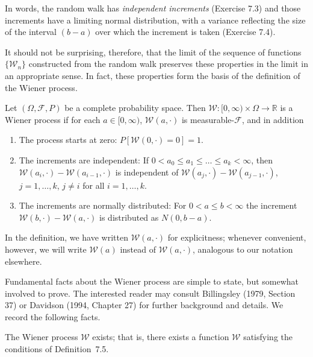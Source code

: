 In words, the random walk has \emph{independent increments} (Exercise 7.3) and those increments have a limiting normal distribution, with a variance reflecting the size of the interval $(b-a)$ over which the increment is taken (Exercise 7.4).

It should not be surprising, therefore, that the limit of the sequence of functions $\{\mathcal{W}_n\}$ constructed from the random walk preserves these properties in the limit in an appropriate sense. In fact, these properties form the basis of the definition of the Wiener process.

\begin{definition}\label{def:wiener}
Let $(\Omega, \mathcal{F}, P)$ be a complete probability space. Then $\mathcal{W} : [0,\infty) \times \Omega \to \mathbb{R}$ is a Wiener process if for each $a \in [0,\infty)$, $\mathcal{W}(a, \cdot)$ is measurable-$\mathcal{F}$, and in addition
\begin{enumerate}[label=(\roman*)]
\item The process starts at zero: $P[\mathcal{W}(0, \cdot) = 0] = 1$.
\item The increments are independent: If $0 < a_0 \leq a_1 \leq \ldots \leq a_k < \infty$, then $\mathcal{W}(a_i, \cdot) - \mathcal{W}(a_{i-1}, \cdot)$ is independent of $\mathcal{W}(a_j, \cdot) - \mathcal{W}(a_{j-1}, \cdot)$, $j = 1, \ldots, k$, $j \neq i$ for all $i = 1, \ldots, k$.
\item The increments are normally distributed: For $0 < a \leq b < \infty$ the increment $\mathcal{W}(b, \cdot) - \mathcal{W}(a, \cdot)$ is distributed as $N(0, b-a)$.
\end{enumerate}
\end{definition}

In the definition, we have written $\mathcal{W}(a, \cdot)$ for explicitness; whenever convenient, however, we will write $\mathcal{W}(a)$ instead of $\mathcal{W}(a, \cdot)$, analogous to our notation elsewhere.

Fundamental facts about the Wiener process are simple to state, but somewhat involved to prove. The interested reader may consult Billingsley (1979, Section 37) or Davidson (1994, Chapter 27) for further background and details. We record the following facts.

\begin{proposition}\label{prop:wiener-existence}
The Wiener process $\mathcal{W}$ exists; that is, there exists a function $\mathcal{W}$ satisfying the conditions of Definition~7.5.
\end{proposition}

